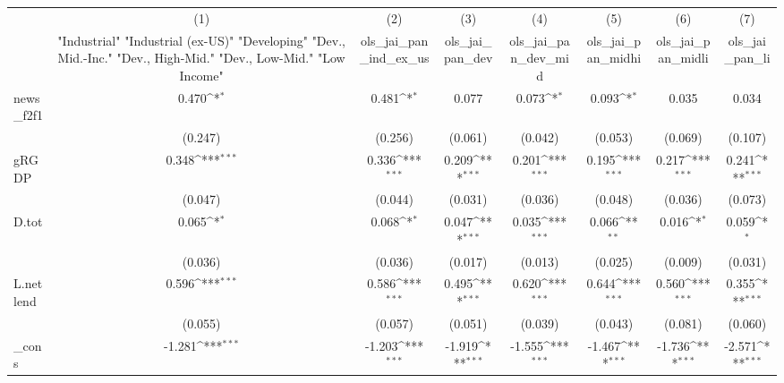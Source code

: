{
\def\sym#1{\ifmmode^{#1}\else\(^{#1}\)\fi}
\begin{tabular}{l*{7}{c}}
\toprule
            &\multicolumn{1}{c}{(1)}&\multicolumn{1}{c}{(2)}&\multicolumn{1}{c}{(3)}&\multicolumn{1}{c}{(4)}&\multicolumn{1}{c}{(5)}&\multicolumn{1}{c}{(6)}&\multicolumn{1}{c}{(7)}\\
            &\multicolumn{1}{c}{ "Industrial" "Industrial (ex-US)" "Developing" "Dev., Mid.-Inc." "Dev., High-Mid."  "Dev., Low-Mid." "Low Income" }&\multicolumn{1}{c}{ols\_jai\_pan\_ind\_ex\_us}&\multicolumn{1}{c}{ols\_jai\_pan\_dev}&\multicolumn{1}{c}{ols\_jai\_pan\_dev\_mid}&\multicolumn{1}{c}{ols\_jai\_pan\_midhi}&\multicolumn{1}{c}{ols\_jai\_pan\_midli}&\multicolumn{1}{c}{ols\_jai\_pan\_li}\\
\midrule
news\_f2f1   &       0.470\sym{*}  &       0.481\sym{*}  &       0.077         &       0.073\sym{*}  &       0.093\sym{*}  &       0.035         &       0.034         \\
            &     (0.247)         &     (0.256)         &     (0.061)         &     (0.042)         &     (0.053)         &     (0.069)         &     (0.107)         \\
\addlinespace
gRGDP       &       0.348\sym{***}&       0.336\sym{***}&       0.209\sym{***}&       0.201\sym{***}&       0.195\sym{***}&       0.217\sym{***}&       0.241\sym{***}\\
            &     (0.047)         &     (0.044)         &     (0.031)         &     (0.036)         &     (0.048)         &     (0.036)         &     (0.073)         \\
\addlinespace
D.tot       &       0.065\sym{*}  &       0.068\sym{*}  &       0.047\sym{***}&       0.035\sym{***}&       0.066\sym{**} &       0.016\sym{*}  &       0.059\sym{*}  \\
            &     (0.036)         &     (0.036)         &     (0.017)         &     (0.013)         &     (0.025)         &     (0.009)         &     (0.031)         \\
\addlinespace
L.netlend   &       0.596\sym{***}&       0.586\sym{***}&       0.495\sym{***}&       0.620\sym{***}&       0.644\sym{***}&       0.560\sym{***}&       0.355\sym{***}\\
            &     (0.055)         &     (0.057)         &     (0.051)         &     (0.039)         &     (0.043)         &     (0.081)         &     (0.060)         \\
\addlinespace
\_cons      &      -1.281\sym{***}&      -1.203\sym{***}&      -1.919\sym{***}&      -1.555\sym{***}&      -1.467\sym{***}&      -1.736\sym{***}&      -2.571\sym{***}\\

\end{tabular}}
